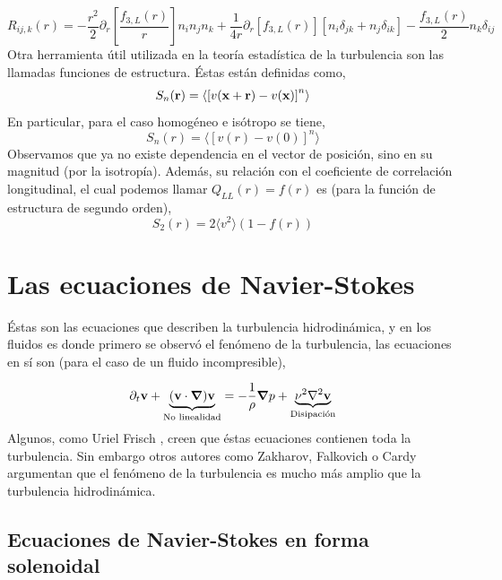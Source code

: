 \documentclass[executivepaper,12pt]{article}
\numberwithin{equation}{section}
\begin{document}
\begin{equation}
	R_{ij,k}(r)=-\frac{r^2}{2}\partial_r\left[\frac{f_{3,L}(r)}{r}\right]n_in_jn_k+\frac{1}{4r}\partial_{r}\left[f_{3,L}(r)\right]\left[n_i\delta_{jk}+n_j\delta_{ik}\right]
	-\frac{f_{3,L}(r)}{2}n_k\delta_{ij}
	\label{eq.corr3}
\end{equation}
Otra herramienta útil utilizada en la teoría estadística de la turbulencia son las llamadas funciones de estructura. Éstas están definidas como,
\begin{equation*}
	S_n(\vb{r})=\langle \left[v(\vb{x+r})-v(\vb{x})\right]^n\rangle
\end{equation*}
En particular, para el caso homogéneo e isótropo se tiene, 
\begin{equation*}
	S_n(r)=\langle \left[v(r)-v(0)\right]^n\rangle
\end{equation*}
Observamos que ya no existe dependencia en el vector de posición, sino en su magnitud (por la isotropía). Además, su relación con el coeficiente de correlación longitudinal, el cual podemos llamar $Q_{LL}(r)=f(r)$ es (para la función de estructura de segundo orden),
\begin{equation*}
	S_2(r)=2\langle v^2 \rangle(1-f(r))
\end{equation*}


\pagebreak 


\section{Las ecuaciones de Navier-Stokes}

Éstas son las ecuaciones que describen la turbulencia hidrodinámica, y en los fluidos es donde primero se observó el fenómeno de la turbulencia, las ecuaciones en sí son (para el caso de un fluido incompresible),

\begin{equation}
	\partial_t \vb{v}+\underbrace{(\vb{v}\cdot\vb{\grad{}})\vb{v}}_{\text{No linealidad}}=-\frac{1}{\rho}\vb{\grad{}}p+\underbrace{\nu^2\laplacian{}\vb{v}}_{\text{Disipación}}
\label{eq.NS}
\end{equation}
 Algunos, como Uriel Frisch \parencite{frisch1995}, creen que éstas ecuaciones contienen toda la turbulencia. Sin embargo otros autores como Zakharov, Falkovich o Cardy \parencite{cardy2008} argumentan que el fenómeno de la turbulencia es mucho más amplio que la turbulencia hidrodinámica.  


\subsection{Ecuaciones de Navier-Stokes en forma solenoidal}
\end{document}
